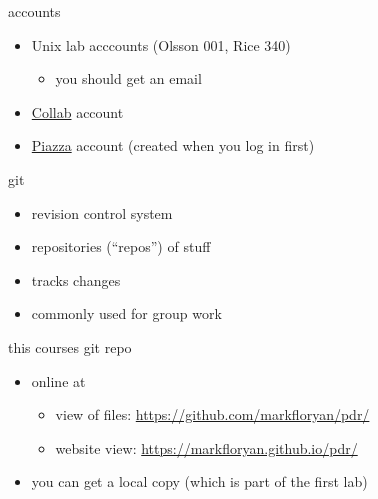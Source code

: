 \begin{frame}{accounts}
    \begin{itemize}
    \item Unix lab acccounts (Olsson 001, Rice 340)
        \begin{itemize}
        \item you should get an email
        \end{itemize}
    \item \href{https://collab.itc.virginia.edu}{Collab} account
    \item \href{https://piazza.com}{Piazza} account (created when you log in first)
    \end{itemize}
\end{frame}

\begin{frame}{git}
    \begin{itemize}
        \item revision control system
        \item repositories (``repos'') of stuff
        \item tracks changes
            \vspace{.5cm}
        \item commonly used for group work
    \end{itemize}
\end{frame}

\begin{frame}{this courses git repo}
    \begin{itemize}
        \item online at
            \begin{itemize}
            \item view of files: \url{https://github.com/markfloryan/pdr/}
            \item website view: \url{https://markfloryan.github.io/pdr/}
            \end{itemize}
        \item you can get a local copy (which is part of the first lab)
    \end{itemize}
\end{frame}

